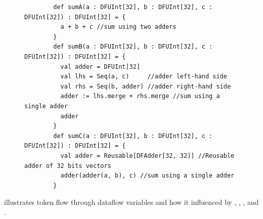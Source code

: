 \begin{itemize}
  \begin{figure}[h]
    \centering
    \begin{minipage}{0.82\linewidth}
      \begin{verbatim}
        def sumA(a : DFUInt[32], b : DFUInt[32], c : DFUInt[32]) : DFUInt[32] = {
          a + b + c //sum using two adders
        }
        def sumB(a : DFUInt[32], b : DFUInt[32], c : DFUInt[32]) : DFUInt[32] = {
          val adder = DFUInt[32]
          val lhs = Seq(a, c)     //adder left-hand side
          val rhs = Seq(b, adder) //adder right-hand side
          adder := lhs.merge + rhs.merge //sum using a single adder
          adder
        }
        def sumC(a : DFUInt[32], b : DFUInt[32], c : DFUInt[32]) : DFUInt[32] = {
          val adder = Reusable[DFAdder[32, 32]] //Reusable adder of 32 bits vectors
          adder(adder(a, b), c) //sum using a single adder
        }
      \end{verbatim}
    \end{minipage}
    \label{fig:Reusable}
  \end{figure}
\end{itemize}

 illustrates token flow through dataflow variables and how it influenced by , , , and .

